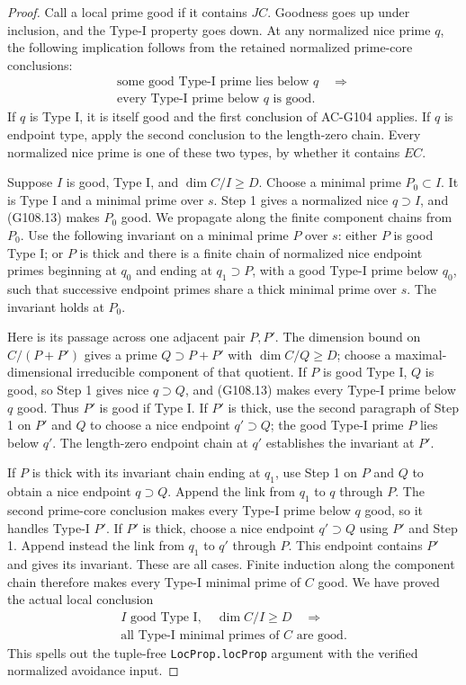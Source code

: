 \begin{proof}
Call a local prime good if it contains $JC$.  Goodness goes up
under inclusion, and the Type-I property goes down.  At any
normalized nice prime $q$, the following implication follows
from the retained normalized prime-core conclusions:
\[
 \begin{gathered}
 \text{some good Type-I prime lies below }q\quad\Longrightarrow\\
 \text{every Type-I prime below }q\text{ is good}.
 \end{gathered}
 \tag{G108.13}
\]
If $q$ is Type I, it is itself good and the first conclusion
of AC-G104 applies.  If $q$ is endpoint type, apply the second
conclusion to the length-zero chain.  Every normalized nice
prime is one of these two types, by whether it contains $EC$.

Suppose $I$ is good, Type I, and $\dim C/I\geq D$.
Choose a minimal prime $P_0\subset I$.  It is Type I and a
minimal prime over $s$.  Step 1 gives a normalized nice
$q\supset I$, and (G108.13) makes $P_0$ good.
We propagate along the finite component chains from $P_0$.
Use the following invariant on a minimal prime $P$ over $s$:
either $P$ is good Type I; or $P$ is thick and there is a finite
chain of normalized nice endpoint primes beginning at $q_0$
and ending at $q_1\supset P$, with a good Type-I prime below
$q_0$, such that successive endpoint primes share a thick
minimal prime over $s$.
The invariant holds at $P_0$.

Here is its passage across one adjacent pair $P,P'$.
The dimension bound on $C/(P+P')$ gives a prime $Q\supset P+P'$
with $\dim C/Q\geq D$; choose a maximal-dimensional irreducible
component of that quotient.  If $P$ is good Type I, $Q$ is good,
so Step 1 gives nice $q\supset Q$, and (G108.13) makes every
Type-I prime below $q$ good.  Thus $P'$ is good if Type I.
If $P'$ is thick, use the second paragraph of Step 1 on $P'$
and $Q$ to choose a nice endpoint $q'\supset Q$; the good
Type-I prime $P$ lies below $q'$.  The length-zero endpoint
chain at $q'$ establishes the invariant at $P'$.

If $P$ is thick with its invariant chain ending at $q_1$, use
Step 1 on $P$ and $Q$ to obtain a nice endpoint $q\supset Q$.
Append the link from $q_1$ to $q$ through $P$.
The second prime-core conclusion makes every Type-I prime
below $q$ good, so it handles Type-I $P'$.
If $P'$ is thick, choose a nice endpoint $q'\supset Q$ using
$P'$ and Step 1.  Append instead the link from $q_1$ to $q'$
through $P$.  This endpoint contains $P'$ and gives its invariant.
These are all cases.  Finite induction along the component chain
therefore makes every Type-I minimal prime of $C$ good.
We have proved the actual local conclusion
\[
 \begin{gathered}
 I\text{ good Type I},\quad\dim C/I\geq D\quad\Longrightarrow\\
 \text{all Type-I minimal primes of }C\text{ are good}.
 \end{gathered}
 \tag{G108.14}
\]
This spells out the tuple-free \texttt{LocProp.locProp} argument
with the verified normalized avoidance input.


\end{proof}
